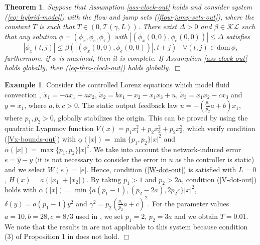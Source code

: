 \documentclass[a4paper, 9pt, twocolumn]{IEEEtran}
\theoremstyle{plain}
\newtheorem{thm}{Theorem}
\theoremstyle{definition}
\newtheorem{exmple}{Example}
\newcommand{\dom}{\ensuremath{\text{dom}\,}}
\newcommand{\KL}{\ensuremath{\mathcal{KL}}}
\begin{document}
\begin{thm} \label{thm: clock-output}
Suppose that Assumption \ref{ass-clock-out} holds and consider system (\ref{eq: hybrid-model}) with the flow and jump sets (\ref{flow-jump-sets-out}), where the constant $T$ is such that $T \in (0,\mathcal{T}(\gamma, L))$. There exist $\Delta> 0$ and $\beta \in \KL$ such that any solution $\phi = (\phi_{x},\phi_{e},\phi_{\tau})$ with $|(\phi_{x}(0,0), \phi_{e}(0,0))|\leq\Delta$  satisfies
\begin{equation} \label{eq-thm-clock-out}
|\phi_{x}(t,j)| \leq \beta(|(\phi_{x}(0,0), \phi_{e}(0,0))|, t + j) \hspace{10pt} \forall(t,j) \in \dom \phi,
\end{equation}
furthermore, if $\phi$ is maximal, then it is complete. If Assumption \ref{ass-clock-out} holds globally, then (\ref{eq-thm-clock-out}) holds globally.
\hfill $\Box$
\end{thm}

\begin{exmple}\label{sec: illutrative-example}
Consider the controlled Lorenz equations which model fluid convection \cite{Wan95nonlinear}, $\dot{x}_{1} = -a x_{1} + a x_{2}$, $\dot{x}_{2} = bx_{1} - x_{2} - x_{1}x_{3} + u$, $\dot{x}_{3} = x_{1}x_{2} - cx_{3}$ and $y = x_{1}$, where $a,b,c > 0$. The static output feedback law $u = -(\frac{p_{1}}{p_{2}}a + b)x_{1}$, where $p_{1}, p_{2}>0$, globally stabilizes the origin. This can be proved by using the quadratic Lyapunov function $V(x) = p_{1}x_{1}^{2} + p_{2}x_{2}^{2} + p_{2}x_{3}^{2}$, which verify condition (\ref{Vx-bounds-out}) with $\underline{\alpha}(|x|)=\min\{p_{1},p_{2}\}|x|^{2}$ and $\overline{\alpha}(|x|)=\max\{p_{1},p_{2}\}|x|^{2}$. We take into account the network-induced error $e = \hat{y} - y$ (it is not necessary to consider the error in $u$ as the controller is static) and we select $W(e) = |e|$. Hence, condition (\ref{W-dot-out}) is satisfied with $L = 0$, $H(x) = a(|x_{1}| + |x_{2}|)$. By taking $p_{1}>1$ and $p_{2}>2a$, condition (\ref{V-dot-out}) holds with $\alpha(|x|) = \min\{a(p_{1} - 1), (p_{2} - 2a), 2p_{2}c\}|x|^{2}$, $\delta(y) = a(p_{1} - 1)y^{2}$ and $\gamma^{2} = p_{2}(\frac{p_{1}}{p_{2}}a + c)^{2}$. For the parameter values $a=10, b= 28, c=8/3$ used in \cite{Wan95nonlinear}, we set $p_{1} = 2$, $p_{2} = 3a$ and we obtain $T = 0.01$. We note that the results in \cite{Yu2012event} are not applicable to this system because condition (3) of Proposition 1 in \cite{Yu2012event} does not hold. \hfill $\Box$
\end{exmple}
\end{document}

